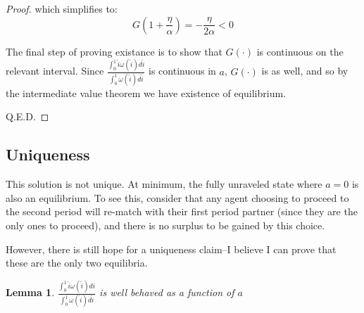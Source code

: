 \documentclass[WP]{AEA}
\newtheorem{lemma}{Lemma}
\begin{document}
\begin{proof}
which simplifies to:
\begin{equation} \label{eq:G_g_0}
G(1+\frac{\eta }{\alpha}) =-\frac{\eta}{ 2 \alpha } < 0 
\end{equation}


The final step of proving existance is to show that $G(\cdot)$ is continuous on the relevant interval. Since  $ \frac{\int_0^1 \hat{i} \omega(\hat{i}) d\hat{i}}{\int_0^1  \omega(\hat{i}) d\hat{i}} $ is continuous in $a$, $G(\cdot)$ is as well, and so by the intermediate value theorem we have existence of equilibrium.

Q.E.D.
\end{proof}
\subsection{Uniqueness}

This solution is not unique.  At minimum, the fully unraveled state where $a= 0$ is also an equilibrium.  To see this, consider that any agent choosing to proceed to the second period will re-match with their first period partner (since they are the only ones to proceed), and there is no surplus to be gained by this choice.

However, there is still hope for a uniqueness claim--I believe I can prove that these are the only two equilibria.

\begin{lemma}
	$ \frac{\int_0^1 \hat{i} \omega(\hat{i}) di}{\int_0^1  \omega(\hat{i}) d\hat{i}}$ is well behaved as a function of $a$
\end{lemma}	
\end{document}
